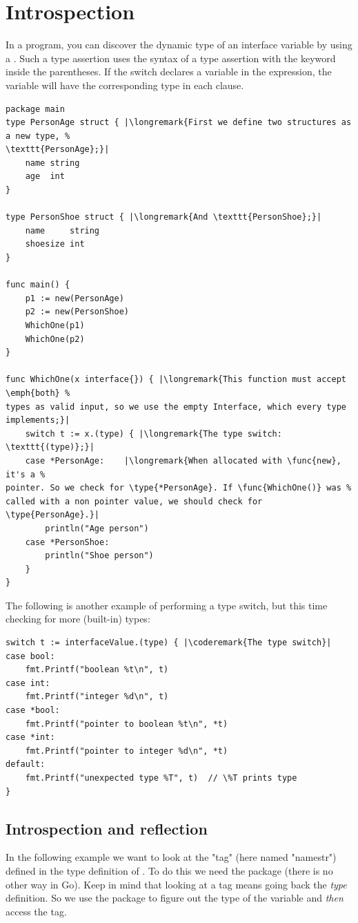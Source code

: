 \section{Introspection}
\label{sec:introspection}
In a program, you can discover the dynamic type of an interface variable
by using a .
Such a type assertion uses
the syntax of a type assertion with the keyword  inside the
parentheses. If the switch declares a variable in the expression, the
variable will have the corresponding type in each clause.
\begin{lstlisting}[caption=Dynamically find out the type]
package main
type PersonAge struct { |\longremark{First we define two structures as a new type, %
\texttt{PersonAge};}|
	name string
	age  int
}

type PersonShoe struct { |\longremark{And \texttt{PersonShoe};}|
	name     string
	shoesize int
}

func main() {
	p1 := new(PersonAge)
	p2 := new(PersonShoe)
	WhichOne(p1)
	WhichOne(p2)
}

func WhichOne(x interface{}) { |\longremark{This function must accept \emph{both} %
types as valid input, so we use the empty Interface, which every type implements;}|
	switch t := x.(type) { |\longremark{The type switch: \texttt{(type)};}|
	case *PersonAge:	|\longremark{When allocated with \func{new}, it's a %
pointer. So we check for \type{*PersonAge}. If \func{WhichOne()} was %
called with a non pointer value, we should check for \type{PersonAge}.}|
		println("Age person")
	case *PersonShoe:
		println("Shoe person")
	}
}
\end{lstlisting}
\showremarks

The following is another example of performing a type switch, but this
time checking for more (built-in) types:
\begin{lstlisting}[caption=A more generic type switch]
switch t := interfaceValue.(type) { |\coderemark{The type switch}|
case bool:
    fmt.Printf("boolean %t\n", t)
case int:
    fmt.Printf("integer %d\n", t)
case *bool:
    fmt.Printf("pointer to boolean %t\n", *t)
case *int:
    fmt.Printf("pointer to integer %d\n", *t)
default:
    fmt.Printf("unexpected type %T", t)  // \%T prints type
}
\end{lstlisting}

\subsection{Introspection and reflection}
\label{subsec:introspection and reflection}
In the following example we want to look at the "tag" (here named
"namestr") defined in the
type definition of . To do this we need the
 package (there is no other way in Go). Keep in mind
that looking at a tag means going back the \emph{type} definition. So
we use the  package to figure out the type of the variable
and \emph{then} access the tag.

